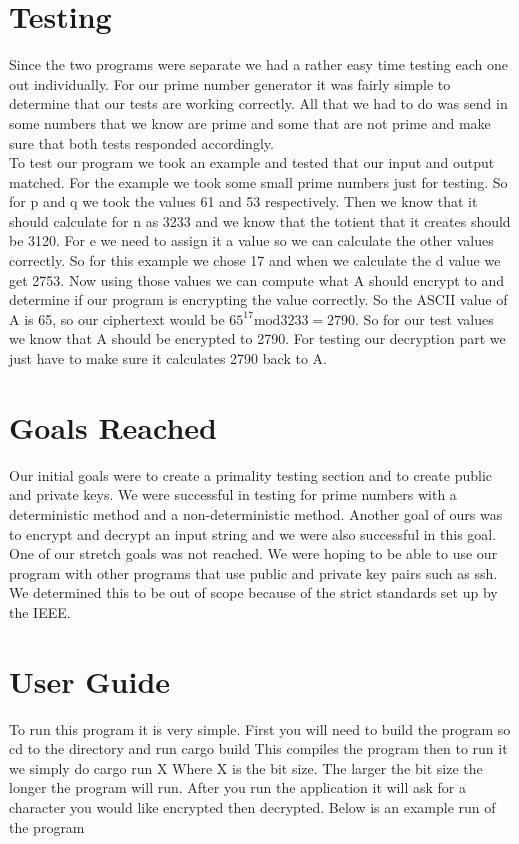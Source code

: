 \documentclass[12pt,journal,compsoc]{IEEEtran}
\begin{document}
\section{Testing}
Since the two programs were separate we had a rather easy time testing each one out individually. 
For our prime number generator it was fairly simple to determine that our tests are working correctly. All that we had to do was send in some numbers that we know are prime and some that are not prime and make sure that both tests responded accordingly. \\ \indent
To test our program we took an example and tested that our input and output matched. For the example we took some small prime numbers just for testing. So for p and q we took the values 61 and 53 respectively. Then we know that it should calculate for n as 3233 and we know that the totient that it creates should be 3120. For e we need to assign it a value so we can calculate the other values correctly. So for this example we chose 17 and when we calculate the d value we get 2753. \newline \indent
Now using those values we can compute what A should encrypt to and determine if our program is encrypting the value correctly. So the ASCII value of A is 65, so our ciphertext would be ${65}^{17}\mathrm{mod}3233=2790$. So for our test values we know that A should be encrypted to 2790. For testing our decryption part we just have to make sure it calculates 2790 back to A.

\section{Goals Reached}
Our initial goals were to create a primality testing section and to create public and private keys. We were successful in testing for prime numbers with a deterministic method and a non-deterministic method. Another goal of ours was to encrypt and decrypt an input string and we were also successful in this goal. \\ \indent One of our stretch goals was not reached. We were hoping to be able to use our program with other programs that use public and private key pairs such as ssh. We determined this to be out of scope because of the strict standards set up by the IEEE. 

\section{User Guide}
To run this program it is very simple. First you will need to build the program so cd to the directory and run 
cargo build
This compiles the program then to run it we simply do 
cargo run X 
Where X is the bit size. The larger the bit size the longer the program will run. After you run the application it will ask for a character you would like encrypted then decrypted. Below is an example run of the program\newline
\end{document}
